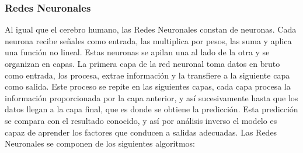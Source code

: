 \subsubsection{Redes Neuronales}
Al igual que el cerebro humano, las Redes Neuronales constan de neuronas. Cada neurona recibe señales como entrada, las multiplica por pesos, las suma y aplica una función no lineal. Estas neuronas se apilan una al lado de la otra y se organizan en capas\cite{Karagiannakos2020}. La primera capa de la red neuronal toma datos en bruto como entrada, los procesa, extrae información y la transfiere a la siguiente capa como salida. Este proceso se repite en las siguientes capas, cada capa procesa la información proporcionada por la capa anterior, y así sucesivamente hasta que los datos llegan a la capa final, que es donde se obtiene la predicción. Esta predicción se compara con el resultado conocido, y así por análisis inverso el modelo es capaz de aprender los factores que conducen a salidas adecuadas\cite{BriegaLopez2015}.  Las Redes Neuronales se componen de los siguientes algoritmos:

